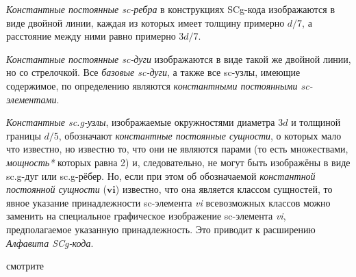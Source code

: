 \begin{SCn}
\begin{scnstruct}
\begin{scnsubstruct}
{                \begin{scnitemize}
                    \item \textit{Константные постоянные sc-ребра} в конструкциях SCg-кода изображаются в виде двойной линии, каждая из которых имеет толщину примерно $d/7$, а расстояние между ними равно примерно $3d/7$.
                    \item \textit{Константные постоянные sc-дуги} изображаются в виде такой же двойной линии, но со стрелочкой. Все \textit{базовые sc-дуги}, а также все sc-узлы, имеющие содержимое, по определению являются \textit{константными постоянными sc-элементами}.
                    \item \textit{Константные sc.g-узлы}, изображаемые окружностями диаметра $3d$ и толщиной границы $d/5$, обозначают \textit{константные постоянные сущности}, о которых мало что известно, но известно то, что они не являются парами (то есть множествами, \textit{мощность*} которых равна 2) и, следовательно, не могут быть изображёны в виде sc.g-дуг или sc.g-рёбер. Но, если при этом об обозначаемой \textit{константной постоянной сущности} ($\bm{vi}$) известно, что она является классом сущностей, то явное указание принадлежности sc-элемента \textit{vi} всевозможных классов можно заменить на специальное графическое изображение sc-элемента \textit{vi}, предполагаемое указанную принадлежность. Это приводит к расширению  \textit{Алфавита SCg-кода}.
                \end{scnitemize}}
            \begin{scnindent}
                \begin{scnrelfromset}{смотрите}
                \end{scnrelfromset}
            \end{scnindent}
\end{scnsubstruct}
\end{scnstruct}
\end{SCn}
